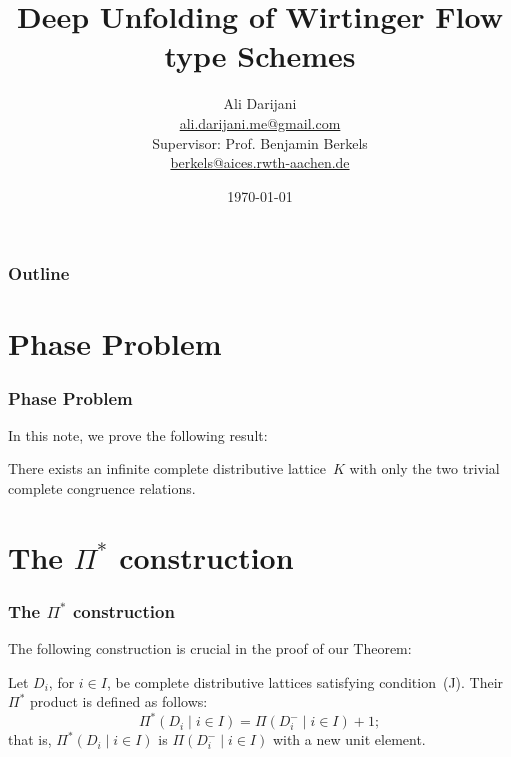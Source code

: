 \documentclass{beamer}
\begin{document}
\title[Deep Unfolding of Wirtinger Flow type Schemes]{Deep Unfolding of Wirtinger Flow type Schemes}
\author[]{Ali Darijani\\ \href{mailto:ali.darijani.me@gmail.com}{ali.darijani.me@gmail.com}\newline
\\ Supervisor: Prof. Benjamin Berkels\\ \href{mailto:berkels@aices.rwth-aachen.de}{berkels@aices.rwth-aachen.de}
}

\date{\today}

\begin{frame}
\titlepage
\end{frame}

\begin{frame}
\frametitle{Outline}

\tableofcontents[pausesections]
\end{frame}

\section{Phase Problem}

\begin{frame}
\frametitle{Phase Problem}

In this note, we prove the following result:

\begin{theorem} 
There exists an infinite complete distributive 
lattice~$K$ with only the two trivial complete 
congruence relations.
\end{theorem}
\end{frame}

\section[Construction]{The $\Pi^{*}$ construction}

\begin{frame}
\frametitle{The $\Pi^{*}$ construction}

The following construction is crucial in the proof
of our Theorem:

\begin{definition} 
Let $D_{i}$, for $i \in I$, be complete distributive 
lattices satisfying condition~\textup{(J)}.  Their 
$\Pi^{*}$ product is defined as follows:
\[
   \Pi^{*} ( D_{i} \mid i \in I ) = 
   \Pi ( D_{i}^{-} \mid i \in I ) + 1;
\]
that is, $\Pi^{*} ( D_{i} \mid i \in I )$ is 
$\Pi ( D_{i}^{-} \mid i \in I )$ with a new 
unit element. 
\end{definition}
\end{frame}
\end{document}
